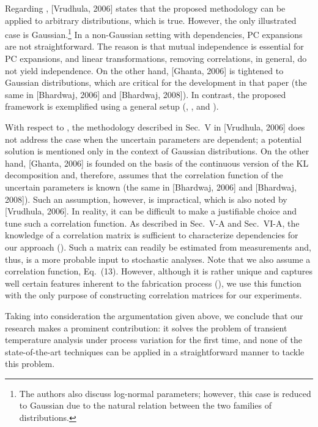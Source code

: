 \begin{authors}
Regarding , [Vrudhula, 2006] states that the proposed methodology can be applied to arbitrary distributions, which is true.
However, the only illustrated case is Gaussian.\footnote{The authors also discuss log-normal parameters; however, this case is reduced to Gaussian due to the natural relation between the two families of distributions.}
In a non-Gaussian setting with dependencies, PC expansions are not straightforward.
The reason is that mutual independence is essential for PC expansions, and linear transformations, removing correlations, in general, do not yield independence.
On the other hand, [Ghanta, 2006] is tightened to Gaussian distributions, which are critical for the development in that paper (the same in [Bhardwaj, 2006] and [Bhardwaj, 2008]).
In contrast, the proposed framework is exemplified using a general setup (, , and ).

With respect to , the methodology described in Sec.~V in [Vrudhula, 2006] does not address the case when the uncertain parameters are dependent; a potential solution is mentioned only in the context of Gaussian distributions.
On the other hand, [Ghanta, 2006] is founded on the basis of the continuous version of the KL decomposition and, therefore, assumes that the correlation function of the uncertain parameters is known (the same in [Bhardwaj, 2006] and [Bhardwaj, 2008]).
Such an assumption, however, is impractical, which is also noted by [Vrudhula, 2006].
In reality, it can be difficult to make a justifiable choice and tune such a correlation function.
As described in Sec.~V-A and Sec.~VI-A, the knowledge of a correlation matrix is sufficient to characterize dependencies for our approach ().
Such a matrix can readily be estimated from measurements and, thus, is a more probable input to stochastic analyses.
Note that we also assume a correlation function, Eq.~(13).
However, although it is rather unique and captures well certain features inherent to the fabrication process (), we use this function with the only purpose of constructing correlation matrices for our experiments.

Taking into consideration the argumentation given above, we conclude that our research makes a prominent contribution: it solves the problem of transient temperature analysis under process variation for the first time, and none of the state-of-the-art techniques can be applied in a straightforward manner to tackle this problem.

\begin{actions}
\end{actions}
\end{authors}

